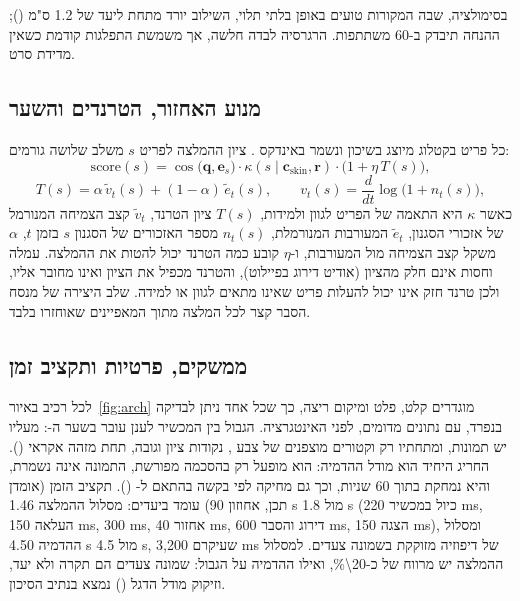 בסימולציה, שבה המקורות טועים באופן בלתי תלוי, השילוב יורד מתחת ליעד של \num{1.2} ס"מ (); ההנחה תיבדק ב-\num{60} משתתפות. הרגרסיה לבדה חלשה, אך משמשת התפלגות קודמת כשאין מדידת סרט.

\subsection{מנוע האחזור, הטרנדים והשער}
כל פריט בקטלוג מיוצג בשיכון  \cite{radford2021clip} ונשמר באינדקס  \cite{johnson2021faiss}. ציון ההמלצה לפריט $s$ משלב שלושה גורמים:
\begin{equation}
\text{score}(s) = \cos\!\big(\mathbf{q},\mathbf{e}_s\big)\cdot \kappa(s \mid \mathbf{c}_{\text{skin}},\mathbf{r}) \cdot \big(1+\eta\,T(s)\big),
\label{eq:score}
\end{equation}
\begin{equation}
T(s) = \alpha\,\tilde v_t(s) + (1-\alpha)\,\tilde e_t(s), \qquad
v_t(s) = \frac{d}{dt}\log\big(1+n_t(s)\big),
\label{eq:trend}
\end{equation}
כאשר $\kappa$ היא התאמה של הפריט לגוון ולמידות, $T(s)$ ציון הטרנד, $\tilde v_t$ קצב הצמיחה המנורמל של אזכורי הסגנון, $\tilde e_t$ המעורבות המנורמלת, $n_t(s)$ מספר האזכורים של הסגנון $s$ בזמן $t$, $\alpha$ משקל קצב הצמיחה מול המעורבות, ו-$\eta$ קובע כמה הטרנד יכול להטות את ההמלצה. עמלה וחסות אינם חלק מהציון (אודיט דירוג בפיילוט), והטרנד מכפיל את הציון ואינו מחובר אליו, ולכן טרנד חזק אינו יכול להעלות פריט שאינו מתאים לגוון או למידה. שלב היצירה של  \cite{lewis2020rag} מנסח הסבר קצר לכל המלצה מתוך המאפיינים שאוחזרו בלבד.

\subsection{ממשקים, פרטיות ותקציב זמן}
\label{sec:latency}
לכל רכיב באיור~\ref{fig:arch} מוגדרים קלט, פלט ומיקום ריצה, כך שכל אחד ניתן לבדיקה בנפרד, עם נתונים מדומים, לפני האינטגרציה. הגבול בין המכשיר לענן עובר בשער ה-: מעליו יש תמונות, ומתחתיו רק וקטורים מוצפנים של צבע , נקודות ציון וגובה, תחת מזהה אקראי (). החריג היחיד הוא מודל ההדמיה: הוא מופעל רק בהסכמה מפורשת, התמונה אינה נשמרת, והיא נמחקת בתוך \num{60} שניות, וכך גם מחיקה לפי בקשה בהתאם ל- \cite{gdpr2016} (). תקציב הזמן (אומדן תכן, אחוזון \num{90}) עומד ביעדים: מסלול ההמלצה \num{1.46 s} מול \num{1.8 s} (כיול במכשיר \num{220 ms}, העלאה \num{150 ms},  \num{300 ms}, אחזור \num{40 ms}, דירוג והסבר \num{600 ms}, הצגה \num{150 ms}), ומסלול ההדמיה \num{4.50 s} מול \num{4.5 s}, שעיקרם \num{3,200 ms} של דיפוזיה מזוקקת בשמונה צעדים. למסלול ההמלצה יש מרווח של כ-\num{20\%}, ואילו ההדמיה על הגבול: שמונה צעדים הם תקרה ולא יעד, וזיקוק מודל הדגל () נמצא בנתיב הסיכון.

